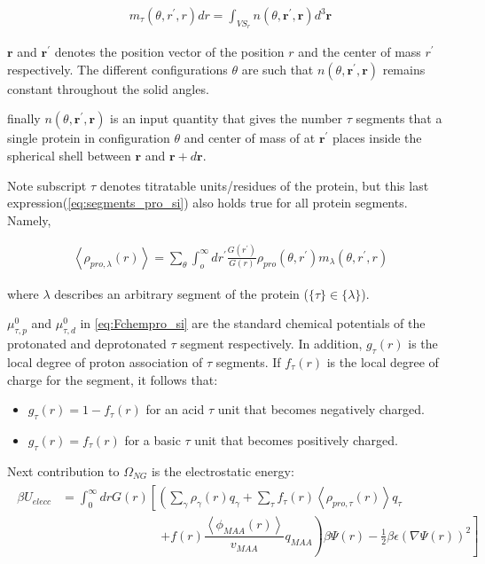 \documentclass[journal=jacsat,manuscript=suppinfo]{achemso}
\begin{document}
\begin{align}
	m_\tau(\theta, r^\prime, r)dr = \int_{VS_r} n(\theta,\textbf{r}^\prime, \textbf{r})d^3\textbf{r}
\end{align}

\noindent  $\textbf{r}$ and $\textbf{r}^\prime$ denotes the position vector of the position $r$ and the center of mass $r^\prime$ respectively. The different configurations $\theta$ are such that $n(\theta,\textbf{r}^\prime, \textbf{r})$ remains constant throughout the solid angles.

 finally $ n(\theta,\textbf{r}^\prime, \textbf{r})$ is an input quantity that gives the number $\tau$ segments that a single protein in configuration $\theta$ and center of mass of at $\textbf{r}^\prime$   places inside the spherical shell between $\textbf{r}$ and $\textbf{r}+d\textbf{r}$. 
 
Note subscript $\tau$ denotes titratable units/residues of the protein, but this last expression(\cref{eq:segments_pro_si}) also holds true for all protein segments.
Namely,

\begin{align}
	\left<\rho_{pro,\lambda}(r)\right> = \sum_\theta \int_o^\infty dr^\prime \frac{G(r^\prime)}{G(r)} \rho_{pro}(\theta,r^\prime)m_\lambda(\theta,r^\prime,r)
	\label{eq:allsegments_pro_si}
\end{align}



\noindent where $\lambda$ describes an arbitrary segment of the protein ($\{\tau\}\in\{\lambda\}$).



$\mu^0_{\tau,p}$ and $\mu^0_{\tau,d}$ in \cref{eq:Fchempro_si} are the standard chemical potentials of the protonated and deprotonated $\tau$ segment respectively.
In addition, $g_\tau(r)$ is the local degree of proton association of $\tau$ segments.
If $f_\tau(r)$ is the local degree of charge for the segment, it follows that: 
\begin{itemize}
	\item $g_\tau(r) = 1-f_\tau(r)$ for an acid $\tau$ unit that becomes negatively charged.
	\item  $g_\tau(r) = f_\tau(r)$ for a basic $\tau$ unit that becomes positively charged.
\end{itemize}


Next contribution to $\Omega_{NG}$ is the electrostatic  energy:
\begin{align}
	\begin{aligned}
		\beta U_{elecc}& = \int_0^\infty drG(r)\left[\left(\sum_{\gamma } \rho_\gamma(r) q_\gamma + \sum_\tau{f_\tau(r) \left<\rho_{pro,\tau}(r)\right> q_\tau}  \right. \right.\\ &\hspace{8em} \left. \left. + f(r)\dfrac{\left<\phi_{MAA}(r)\right>}{v_{MAA}}q_{MAA}\right)\beta\Psi(r) -\frac{1}{2}\beta\epsilon(\nabla\Psi(r))^2 \right]
	\end{aligned}
\end{align} 
\end{document}
